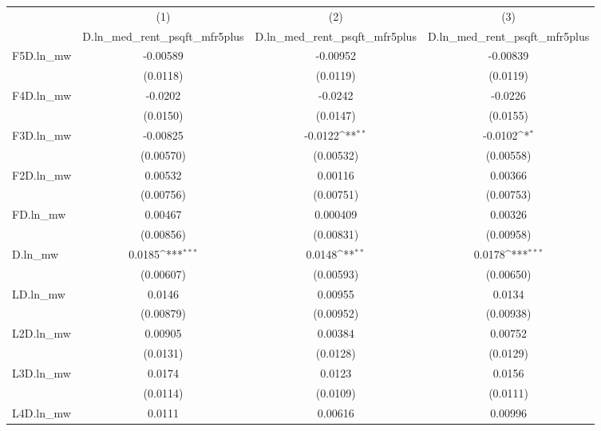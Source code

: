 {
\def\sym#1{\ifmmode^{#1}\else\(^{#1}\)\fi}
\begin{tabular}{l*{3}{c}}
\hline\hline
          &\multicolumn{1}{c}{(1)}&\multicolumn{1}{c}{(2)}&\multicolumn{1}{c}{(3)}\\
          &\multicolumn{1}{c}{D.ln\_med\_rent\_psqft\_mfr5plus}&\multicolumn{1}{c}{D.ln\_med\_rent\_psqft\_mfr5plus}&\multicolumn{1}{c}{D.ln\_med\_rent\_psqft\_mfr5plus}\\
\hline
F5D.ln\_mw & -0.00589         & -0.00952         & -0.00839         \\
          & (0.0118)         & (0.0119)         & (0.0119)         \\
[1em]
F4D.ln\_mw &  -0.0202         &  -0.0242         &  -0.0226         \\
          & (0.0150)         & (0.0147)         & (0.0155)         \\
[1em]
F3D.ln\_mw & -0.00825         &  -0.0122\sym{**} &  -0.0102\sym{*}  \\
          &(0.00570)         &(0.00532)         &(0.00558)         \\
[1em]
F2D.ln\_mw &  0.00532         &  0.00116         &  0.00366         \\
          &(0.00756)         &(0.00751)         &(0.00753)         \\
[1em]
FD.ln\_mw  &  0.00467         & 0.000409         &  0.00326         \\
          &(0.00856)         &(0.00831)         &(0.00958)         \\
[1em]
D.ln\_mw   &   0.0185\sym{***}&   0.0148\sym{**} &   0.0178\sym{***}\\
          &(0.00607)         &(0.00593)         &(0.00650)         \\
[1em]
LD.ln\_mw  &   0.0146         &  0.00955         &   0.0134         \\
          &(0.00879)         &(0.00952)         &(0.00938)         \\
[1em]
L2D.ln\_mw &  0.00905         &  0.00384         &  0.00752         \\
          & (0.0131)         & (0.0128)         & (0.0129)         \\
[1em]
L3D.ln\_mw &   0.0174         &   0.0123         &   0.0156         \\
          & (0.0114)         & (0.0109)         & (0.0111)         \\
[1em]
L4D.ln\_mw &   0.0111         &  0.00616         &  0.00996         \\

\end{tabular}}

